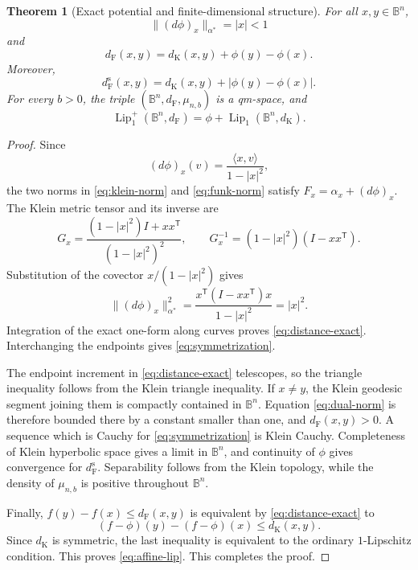 \documentclass{amsart}
\numberwithin{equation}{section}
\theoremstyle{plain}
\newtheorem{theorem}{Theorem}[section]
\theoremstyle{definition}
\theoremstyle{remark}
\newcommand{\B}{\mathbb B}
\newcommand{\Lipplus}{\operatorname{Lip}^{+}_{1}}
\newcommand{\dF}{d_{\mathrm F}}
\newcommand{\dK}{d_{\mathrm K}}
\begin{document}
\begin{theorem}[Exact potential and finite-dimensional structure]\label{thm:exact-finite-geometry}
For all $x,y\in\B^n$,
\begin{equation}\label{eq:dual-norm} \lVert(d\phi)_x\rVert_{\alpha^*}=|x|<1 \end{equation}
and
\begin{equation}\label{eq:distance-exact} \dF(x,y)=\dK(x,y)+\phi(y)-\phi(x). \end{equation}
Moreover,
\begin{equation}\label{eq:symmetrization} \dF^{\mathrm s}(x,y)=\dK(x,y)+|\phi(y)-\phi(x)|. \end{equation}
For every $b>0$, the triple $(\B^n,\dF,\mu_{n,b})$ is a qm-space, and
\begin{equation}\label{eq:affine-lip} \Lipplus(\B^n,\dF) =\phi+\operatorname{Lip}_1(\B^n,\dK). \end{equation}
\end{theorem}

\begin{proof}
Since
\[ (d\phi)_x(v)=\frac{\langle x,v\rangle}{1-|x|^2}, \]
the two norms in \eqref{eq:klein-norm} and \eqref{eq:funk-norm} satisfy $F_x=\alpha_x+(d\phi)_x$.  The Klein metric tensor and its inverse are
\[ G_x=\frac{(1-|x|^2)I+xx^{\mathsf T}}{(1-|x|^2)^2}, \qquad G_x^{-1}=(1-|x|^2)(I-xx^{\mathsf T}). \]
Substitution of the covector $x/(1-|x|^2)$ gives
\[ \lVert(d\phi)_x\rVert_{\alpha^*}^2 =\frac{x^{\mathsf T}(I-xx^{\mathsf T})x}{1-|x|^2} =|x|^2. \]
Integration of the exact one-form along curves proves \eqref{eq:distance-exact}.  Interchanging the endpoints gives \eqref{eq:symmetrization}.

The endpoint increment in \eqref{eq:distance-exact} telescopes, so the triangle inequality follows from the Klein triangle inequality.  If $x\ne y$, the Klein geodesic segment joining them is compactly contained in $\B^n$.  Equation \eqref{eq:dual-norm} is therefore bounded there by a constant smaller than one, and $\dF(x,y)>0$.  A sequence which is Cauchy for \eqref{eq:symmetrization} is Klein Cauchy.  Completeness of Klein hyperbolic space gives a limit in $\B^n$, and continuity of $\phi$ gives convergence for $\dF^{\mathrm s}$.  Separability follows from the Klein topology, while the density of $\mu_{n,b}$ is positive throughout $\B^n$.

Finally, $f(y)-f(x)\le\dF(x,y)$ is equivalent by \eqref{eq:distance-exact} to
\[ (f-\phi)(y)-(f-\phi)(x)\le\dK(x,y). \]
Since $\dK$ is symmetric, the last inequality is equivalent to the ordinary $1$-Lipschitz condition.  This proves \eqref{eq:affine-lip}.
	This completes the proof.
\end{proof}
\end{document}
